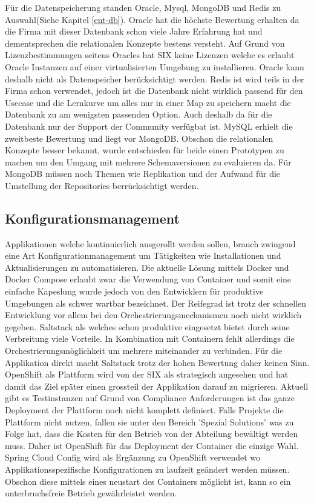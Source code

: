 Für die Datenspeicherung standen Oracle, Mysql, MongoDB und Redis zu Auswahl(Siehe Kapitel \ref{ent-db}). \newline
Oracle hat die höchste Bewertung erhalten da die Firma mit dieser Datenbank schon viele Jahre Erfahrung hat und dementsprechen die relationalen Konzepte bestens versteht. Auf Grund von Lizenzbestimmungen seitens Oracles hat SIX keine Lizenzen welche es erlaubt Oracle Instanzen auf einer virtualisierten Umgebung zu installieren. Oracle kann deshalb nicht als Datenspeicher berücksichtigt werden.\newline
Redis ist wird teils in der Firma schon verwendet, jedoch ist die Datenbank nicht wirklich passend für den Usecase und die Lernkurve um alles nur in einer Map zu speichern macht die Datenbank zu am wenigsten passenden Option. Auch deshalb da für die Datenbank nur der Support der Community verfügbat ist.\newline
MySQL erhielt die zweitbeste Bewertung und liegt vor MongoDB. Obschon die relationalen Konzepte besser bekannt, wurde entschieden für beide einen Prototypen zu machen um den Umgang mit mehrere Schemaversionen zu evaluieren da. Für MongoDB müssen noch Themen wie Replikation und der Aufwand für die Umstellung der Repositories berrücksichtigt werden.

\subsection{Konfigurationsmanagement}

Applikationen welche kontinuierlich ausgerollt werden sollen, brauch zwingend eine Art Konfigurationmanagement um Tätigkeiten wie Installationen und Aktualisierungen zu automatisieren. Die aktuelle Lösung mittels Docker und Docker Compose erlaubt zwar die Verwendung von Container und somit eine einfache Kapeslung wurde jedoch von den Entwicklern für produktive Umgebungen als schwer wartbar bezeichnet. Der Reifegrad ist trotz der schnellen Entwicklung vor allem bei den Orchestrierungsmechanismen noch nicht wirklich gegeben.\newline
Saltstack als welches schon produktive eingesetzt bietet durch seine Verbreitung viele Vorteile. In Kombination mit Containern fehlt allerdings die Orchestrierungsmöglichkeit um mehrere miteinander zu verbinden. Für die Applikation direkt macht Saltstack trotz der hohen Bewertung daher keinen Sinn.\newline
OpenShift als Plattform wird von der SIX als strategisch angesehen und hat damit das Ziel später einen grossteil der Applikation darauf zu migrieren. Aktuell gibt es Testinstanzen auf Grund von Compliance Anforderungen ist das ganze Deployment der Plattform noch nicht komplett definiert. Falls Projekte die Plattform nicht nutzen, fallen sie unter den Bereich 'Spezial Solutions' was zu Folge hat, dass die Kosten für den Betrieb von der Abteilung bewältigt werden muss. Daher ist OpenShift für das Deployment der Container die einzige Wahl.
Spring Cloud Config wird als Ergänzung zu OpenShift verwendet wo Applikationsspezifische Konfigurationen zu laufzeit geändert werden müssen. Obschon diese mittels eines neustart des Containers möglicht ist, kann so ein unterbruchsfreie Betrieb gewährleistet werden.

